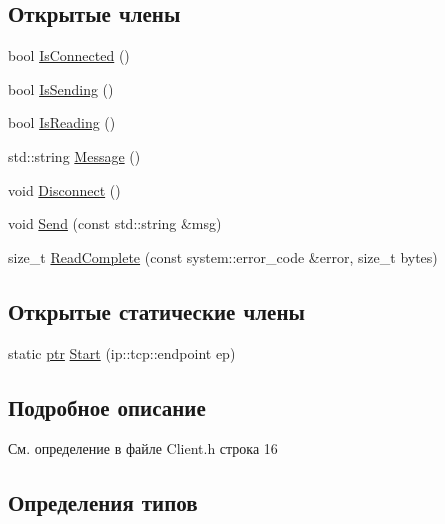 \subsection*{Открытые члены}
\begin{DoxyCompactItemize}
\item 
bool \mbox{\hyperlink{class_server_link_a2f551c4fffbedab55adab3d528df0f0c}{Is\+Connected}} ()
\item 
bool \mbox{\hyperlink{class_server_link_ab79487df49a22e5533c96032ef413e16}{Is\+Sending}} ()
\item 
bool \mbox{\hyperlink{class_server_link_a9cdc703cdda0ff80c49434d483654d7e}{Is\+Reading}} ()
\item 
std\+::string \mbox{\hyperlink{class_server_link_a712791c09323fcf6db49ceb0a10f8d9c}{Message}} ()
\item 
void \mbox{\hyperlink{class_server_link_afa570df0c508889210e9ac2ff5983306}{Disconnect}} ()
\item 
void \mbox{\hyperlink{class_server_link_accf9e304c68111f1dbb1df82e2ae3ca5}{Send}} (const std\+::string \&msg)
\item 
size\+\_\+t \mbox{\hyperlink{class_server_link_a57df20ef340ea6f42157ff40aa57427a}{Read\+Complete}} (const system\+::error\+\_\+code \&error, size\+\_\+t bytes)
\end{DoxyCompactItemize}
\subsection*{Открытые статические члены}
\begin{DoxyCompactItemize}
\item 
static \mbox{\hyperlink{class_server_link_afb05b9f4060b17ac50d2fb3b874ce236}{ptr}} \mbox{\hyperlink{class_server_link_a72edc7fb4b20cc9bd157863b2ee4b279}{Start}} (ip\+::tcp\+::endpoint ep)
\end{DoxyCompactItemize}


\subsection{Подробное описание}


См. определение в файле Client.\+h строка 16



\subsection{Определения типов}
\mbox{\label{class_server_link_afb05b9f4060b17ac50d2fb3b874ce236}} 
